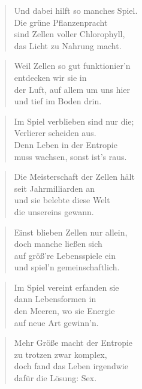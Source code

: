 \documentclass[10pt,a4paper]{article}
\begin{document}
\begin{paracol}{2}
\begin{verse}
Und dabei hilft so manches Spiel. \\
Die grüne Pflanzenpracht \\
sind Zellen voller Chlorophyll, \\
das Licht zu Nahrung macht. \\
\end{verse}

\begin{verse}
Weil Zellen so gut funktionier’n \\
entdecken wir sie in \\
der Luft, auf allem um uns hier \\
und tief im Boden drin. \\
\end{verse}

\begin{verse}
Im Spiel verblieben sind nur die; \\
Verlierer scheiden aus. \\
Denn Leben in der Entropie \\
muss wachsen, sonst ist’s raus. \\
\end{verse}

\begin{verse}
Die Meisterschaft der Zellen hält \\
seit Jahrmilliarden an \\
und sie belebte diese Welt \\
die unsereins gewann. \\
\end{verse}

\begin{verse}
Einst blieben Zellen nur allein, \\
doch manche ließen sich \\
auf größ’re Lebensspiele ein \\
und spiel’n gemeinschaftlich. \\
\end{verse}

\begin{verse}
Im Spiel vereint erfanden sie \\
dann Lebensformen in \\
den Meeren, wo sie Energie \\
auf neue Art gewinn’n. \\
\end{verse}

\begin{verse}
Mehr Größe macht der Entropie \\
zu trotzen zwar komplex, \\
doch fand das Leben irgendwie \\
dafür die Lösung: Sex. \\
\end{verse}


\end{paracol}
\end{document}
